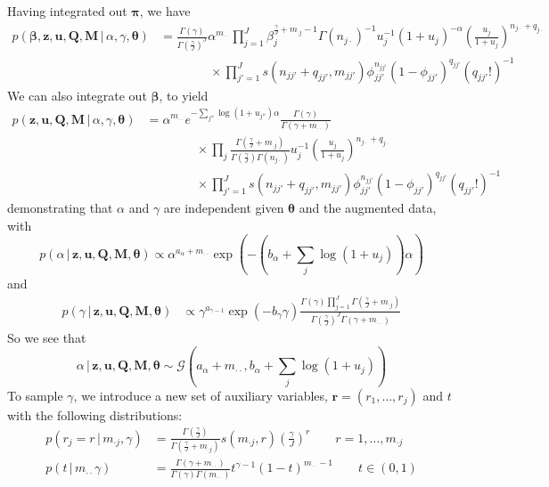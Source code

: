 \documentclass[12pt,letterpaper]{report}
\newcommand{\Gamm}[2]{\mathcal{G}(#1,#2)}
\newcommand{\given}{\, \vert \,}
\newcommand{\bM}{\mathbf{M}}
\newcommand{\bQ}{\mathbf{Q}}
\newcommand{\bz}{\mathbf{z}}
\newcommand{\bu}{\mathbf{u}}
\newcommand{\br}{\mathbf{r}}
\newcommand{\bbeta}{\boldsymbol{\beta}}
\newcommand{\btheta}{\boldsymbol{\theta}}
\newcommand{\bpi}{\boldsymbol{\pi}}
\begin{document}
Having integrated out $\bpi$, we have
\begin{align}
  p(\bbeta, \bz, \bu, \bQ, \bM \given \alpha, \gamma, \btheta) &=
  \frac{\Gamma(\gamma)}{\Gamma(\frac{\gamma}{J})^J} \alpha^{m_{\cdot\cdot}} \prod_{j=1}^J \beta_j^{\frac{\gamma}{J} +
    m_{\cdot j} - 1}\Gamma(n_{j\cdot})^{-1} u_j^{-1}(1+u_j)^{-\alpha}
  \left(\frac{u_j}{1+u_j}\right)^{n_{j\cdot} + q_{j\cdot}} \\ &\qquad
  \qquad \times \prod_{j' =
    1}^J s(n_{jj'} + q_{jj'}, m_{jj'}) \phi_{jj'}^{n_{jj'}}(1-\phi_{jj'})^{q_{jj'}}
  (q_{jj'}!)^{-1}
\end{align}
We can also integrate out $\bbeta$, to yield
\begin{align}
  p(\bz, \bu, \bQ, \bM \given \alpha, \gamma, \btheta) &=
  \alpha^{m_{\cdot\cdot}} e^{-\sum_{j''} \log(1+u_{j''}) \alpha}
  \frac{\Gamma(\gamma)}{\Gamma(\gamma + m_{\cdot\cdot})} \\ &\qquad
  \qquad \times \prod_j
  \frac{\Gamma(\frac{\gamma}{J} + m_{\cdot
      j})}{\Gamma(\frac{\gamma}{J}) \Gamma(n_{j\cdot})} u_j^{-1}
  \left(\frac{u_j}{1+u_j}\right)^{n_{j\cdot} + q_{j\cdot}} \\ &\qquad
  \qquad \times \prod_{j' =
    1}^J s(n_{jj'} + q_{jj'}, m_{jj'}) \phi_{jj'}^{n_{jj'}}(1-\phi_{jj'})^{q_{jj'}}
  (q_{jj'}!)^{-1}
\end{align}
demonstrating that $\alpha$ and $\gamma$ are independent given $\btheta$
and the augmented data, with
\begin{equation}
  \label{eq:43}
  p(\alpha \given \bz, \bu, \bQ, \bM, \btheta) \propto
  \alpha^{a_{\alpha} + m_{\cdot\cdot}}\exp(-(b_\alpha + \sum_{j}\log(1+u_j))\alpha)
\end{equation}
and
\begin{align}
  \label{eq:8}
  p(\gamma \given \bz, \bu, \bQ, \bM, \btheta) &\propto \gamma^{a_{\gamma - 1}}
  \exp(-b_{\gamma}\gamma) \frac{\Gamma(\gamma)\prod_{j=1}^J
    \Gamma(\frac{\gamma}{J} + m_{\cdot j})}{\Gamma(\frac{\gamma}{J})^J\Gamma(\gamma + m_{\cdot\cdot})}
\end{align}
So we see that
\begin{equation}
  \label{eq:44}
  \alpha \given \bz, \bu, \bQ, \bM, \btheta \sim \Gamm{a_{\alpha}
    + m_{\cdot\cdot}}{b_\alpha + \sum_j\log(1+u_j)}
\end{equation}
To sample $\gamma$, we introduce a new set of auxiliary variables, $\br = (r_1, \dots,
r_j)$ and $t$ with the following distributions:
\begin{align}
  \label{eq:9}
  p(r_j = r \given m_{\cdot j}, \gamma) &=
  \frac{\Gamma(\frac{\gamma}{J})}{\Gamma(\frac{\gamma}{J}
    + m_{\cdot j})} s(m_{\cdot j}, r)
    \left(\frac{\gamma}{J}\right)^r \qquad r  = 1, \dots, m_{\cdot j} \\
  p(t \given m_{\cdot\cdot} \gamma) &= \frac{\Gamma(\gamma +
    m_{\cdot\cdot})}{\Gamma(\gamma) \Gamma(m_{\cdot\cdot})} t^{\gamma
    - 1} (1-t)^{m_{\cdot\cdot} - 1} \qquad t \in (0,1)
\end{align}
\end{document}
